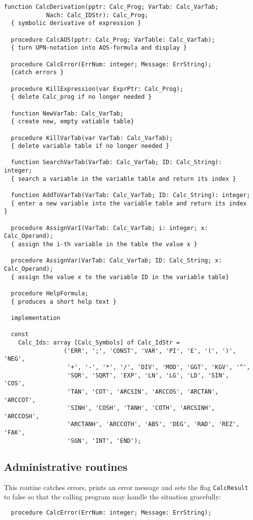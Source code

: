 \begin{refsection}
\begin{lstlisting}[caption=Interface]
  function CalcDerivation(pptr: Calc_Prog; VarTab: Calc_VarTab;
            Nach: Calc_IDStr): Calc_Prog;
  { symbolic derivative of expression }

  procedure CalcAOS(pptr: Calc_Prog; VarTable: Calc_VarTab);
  { turn UPN-notation into AOS-formula and display }

  procedure CalcError(ErrNum: integer; Message: ErrString);
  {catch errors }

  procedure KillExpression(var ExprPtr: Calc_Prog);
  { delete Calc_prog if no longer needed }

  function NewVarTab: Calc_VarTab;
  { create new, empty vatiable table}

  procedure KillVarTab(var VarTab: Calc_VarTab);
  { delete variable table if no longer needed }

  function SearchVarTab(VarTab: Calc_VarTab; ID: Calc_String): integer;
  { search a variable in the variable table and return its index }

  function AddToVarTab(VarTab: Calc_VarTab; ID: Calc_String): integer;
  { enter a new variable into the variable table and return its index }

  procedure AssignVarI(VarTab: Calc_VarTab; i: integer; x: Calc_Operand);
  { assign the i-th variable in the table the value x }

  procedure AssignVar(VarTab: Calc_VarTab; ID: Calc_String; x: Calc_Operand);
  { assign the value x to the variable ID in the variable table}

  procedure HelpFormula;
  { produces a short help text }

  implementation

  const
    Calc_Ids: array [Calc_Symbols] of Calc_IdStr =
                 ('ERR', ';', 'CONST', 'VAR', 'PI', 'E', '(', ')', 'NEG',
                  '+', '-', '*', '/', 'DIV', 'MOD', 'GGT', 'KGV', '^',
                  'SQR', 'SQRT', 'EXP', 'LN', 'LG', 'LD', 'SIN', 'COS',
                  'TAN', 'COT', 'ARCSIN', 'ARCCOS', 'ARCTAN', 'ARCCOT',
                  'SINH', 'COSH', 'TANH', 'COTH', 'ARCSINH', 'ARCCOSH',
                  'ARCTANH', 'ARCCOTH', 'ABS', 'DEG', 'RAD', 'REZ', 'FAK',
                  'SGN', 'INT', 'END');
\end{lstlisting}

\subsection{Administrative routines}

This routine catches errors, prints an error message and sets the flag \texttt{CalcResult} to false so that the calling program may handle the situation gracefully:
\begin{lstlisting}
  procedure CalcError(ErrNum: integer; Message: ErrString);


\end{lstlisting}
\end{refsection}
